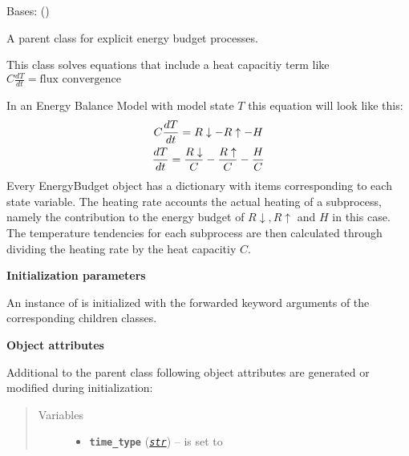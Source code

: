 \documentclass[a4paper,10pt,english]{sphinxmanual}
\begin{document}
\begin{fulllineitems}
\label{api/climlab.process:climlab.process.energy_budget.EnergyBudget}
Bases: {\hyperref[api/climlab.process:climlab.process.time_dependent_process.TimeDependentProcess]{\emph{}}} ()

A parent class for explicit energy budget processes.

This class solves equations that include a heat capacitiy term like
\(C \frac{dT}{dt} = \textrm{flux convergence}\)

In an Energy Balance Model with model state \(T\) this equation 
will look like this:
\begin{gather}
\begin{split}C \frac{dT}{dt} = R\downarrow - R\uparrow - H  \end{split}\notag\\\begin{split}\frac{dT}{dt} = \frac{R\downarrow}{C} - \frac{R\uparrow}{C} - \frac{H}{C}\end{split}\notag
\end{gather}
Every EnergyBudget object has a  dictionary with items 
corresponding to each state variable. The heating rate accounts the actual 
heating of a subprocess, namely the contribution to the energy budget 
of \(R\downarrow, R\uparrow\) and \(H\) in this case.
The temperature tendencies for each subprocess are then calculated 
through dividing the heating rate by the heat capacitiy \(C\).

\textbf{Initialization parameters}

An instance of  is initialized with the forwarded 
keyword arguments  of the corresponding children classes.

\textbf{Object attributes}

Additional to the parent class 
following object attributes are generated or modified during initialization:
\begin{quote}\begin{description}
\item[{Variables}] \leavevmode\begin{itemize}
\item {} 
\textbf{\texttt{time\_type}} (\href{http://docs.python.org/2.7/library/functions.html\#str}{\emph{\texttt{str}}}) -- is set to 


\end{itemize}
\end{description}
\end{quote}
\end{fulllineitems}
\end{document}
